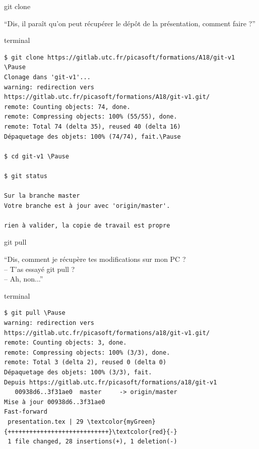 \documentclass[usepdftitle=false]{beamer}
\def\seplength{.3\topsep}
\newcommand{\Pause}{%
\ifdef{\Release}
  {\pause}
  {}
}
\begin{document}
\begin{frame}[fragile]{git clone}
	\begin{block}{}
	\enquote{Dis, il paraît qu'on peut récupérer le dépôt de la présentation, comment faire ?}
	\end{block}
	\begin{beamercolorbox}[rounded=true,shadow=true]{terminal}
		\vspace{-\seplength}
\begin{Verbatim}
$ git clone https://gitlab.utc.fr/picasoft/formations/A18/git-v1 \Pause
Clonage dans 'git-v1'...
warning: redirection vers https://gitlab.utc.fr/picasoft/formations/A18/git-v1.git/
remote: Counting objects: 74, done.
remote: Compressing objects: 100% (55/55), done.
remote: Total 74 (delta 35), reused 40 (delta 16)
Dépaquetage des objets: 100% (74/74), fait.\Pause

$ cd git-v1 \Pause

$ git status

Sur la branche master
Votre branche est à jour avec 'origin/master'.

rien à valider, la copie de travail est propre
		\end{Verbatim}
	\end{beamercolorbox}
\end{frame}

\begin{frame}[fragile]{git pull}
	\begin{block}{}
		\enquote{Dis, comment je récupère tes modifications sur mon PC ? \\
		-- T'as essayé git pull ? \\
		-- Ah, non...}
	\end{block}
	\begin{beamercolorbox}[rounded=true,shadow=true]{terminal}
		\vspace{-\seplength}
	\begin{Verbatim}
$ git pull \Pause
warning: redirection vers https://gitlab.utc.fr/picasoft/formations/a18/git-v1.git/
remote: Counting objects: 3, done.
remote: Compressing objects: 100% (3/3), done.
remote: Total 3 (delta 2), reused 0 (delta 0)
Dépaquetage des objets: 100% (3/3), fait.
Depuis https://gitlab.utc.fr/picasoft/formations/a18/git-v1
   00938d6..3f31ae0  master     -> origin/master
Mise à jour 00938d6..3f31ae0
Fast-forward
 presentation.tex | 29 \textcolor{myGreen}{++++++++++++++++++++++++++++}\textcolor{red}{-}
 1 file changed, 28 insertions(+), 1 deletion(-)
	\end{Verbatim}
	\end{beamercolorbox}
\end{frame}
\end{document}
